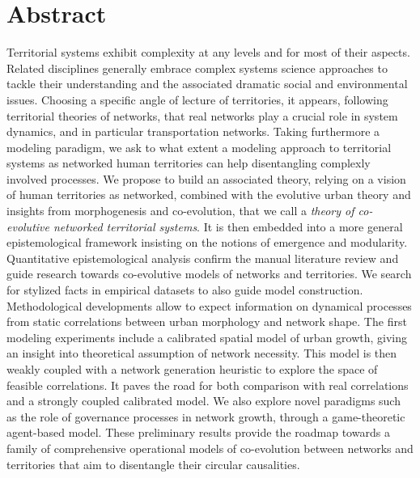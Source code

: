 


\begingroup
\let\clearpage\relax
\let\cleardoublepage\relax
\let\cleardoublepage\relax

\chapter*{Abstract}


Territorial systems exhibit complexity at any levels and for most of their aspects. Related disciplines generally embrace complex systems science approaches to tackle their understanding and the associated dramatic social and environmental issues. Choosing a specific angle of lecture of territories, it appears, following territorial theories of networks, that real networks play a crucial role in system dynamics, and in particular transportation networks. Taking furthermore a modeling paradigm, we ask to what extent a modeling approach to territorial systems as networked human territories can help disentangling complexly involved processes. We propose to build an associated theory, relying on a vision of human territories as networked, combined with the evolutive urban theory and insights from morphogenesis and co-evolution, that we call a \emph{theory of co-evolutive networked territorial systems}. It is then embedded into a more general epistemological framework insisting on the notions of emergence and modularity. Quantitative epistemological analysis confirm the manual literature review and guide research towards co-evolutive models of networks and territories. We search for stylized facts in empirical datasets to also guide model construction. Methodological developments allow to expect information on dynamical processes from static correlations between urban morphology and network shape. The first modeling experiments include a calibrated spatial model of urban growth, giving an insight into theoretical assumption of network necessity. This model is then weakly coupled with a network generation heuristic to explore the space of feasible correlations. It paves the road for both comparison with real correlations and a strongly coupled calibrated model. We also explore novel paradigms such as the role of governance processes in network growth, through a game-theoretic agent-based model. These preliminary results provide the roadmap towards a family of comprehensive operational models of co-evolution between networks and territories that aim to disentangle their circular causalities.






\endgroup			

\vfill